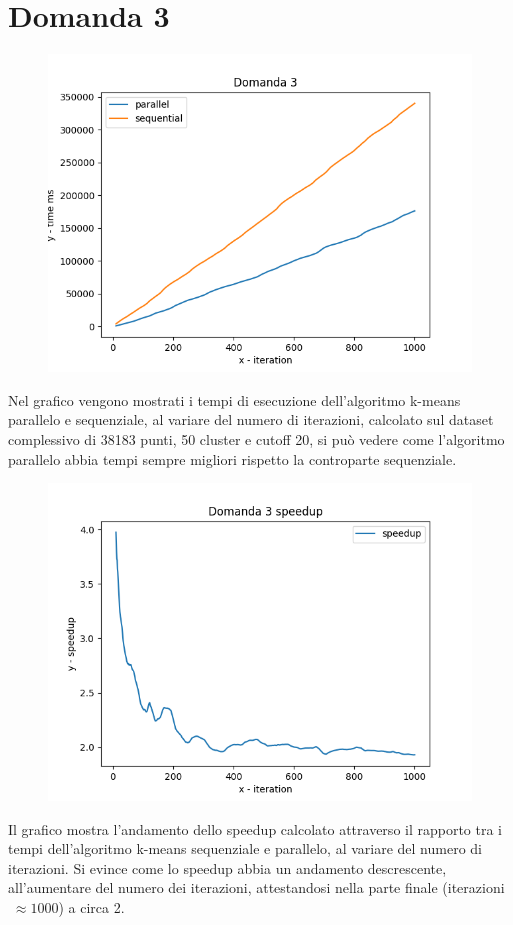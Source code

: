 \documentclass{article}
\begin{document}
\section*{Domanda 3}
\begin{center}
	\begin{figure}[H]
		\includegraphics[width=1\linewidth, valign=t]{figures/domanda3}
	\end{figure}
\end{center}
Nel grafico vengono mostrati i tempi di esecuzione dell'algoritmo k-means parallelo e sequenziale, al variare del numero di iterazioni, calcolato sul dataset complessivo di 38183 punti, 50 cluster e cutoff 20, si può vedere come l'algoritmo parallelo abbia tempi sempre migliori rispetto la controparte sequenziale.
	

\begin{center}
	\begin{figure}[H]
		\includegraphics[width=1\linewidth, valign=t]{figures/domanda3speedup}
	\end{figure}
\end{center}
Il grafico mostra l'andamento dello speedup calcolato attraverso il rapporto tra i tempi dell'algoritmo k-means sequenziale e parallelo, al variare del numero di iterazioni. Si evince come lo speedup abbia un andamento descrescente, all'aumentare del numero dei iterazioni, attestandosi nella parte finale (iterazioni $\;\approx 1000$) a circa 2.
\end{document}
